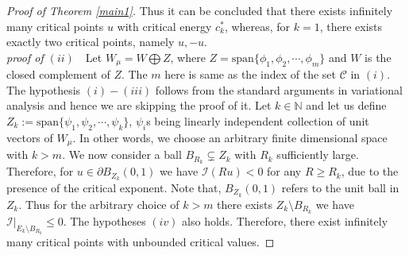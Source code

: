 \documentclass[12pt]{extarticle}
\theoremstyle{definition}
\theoremstyle{remark}
\theoremstyle{definition}
\numberwithin{equation}{section}
\numberwithin{equation}{section}
\begin{document}
\begin{proof}[Proof of Theorem \ref{main1}]
Thus it can be concluded that there exists infinitely many critical points $u$ with critical energy $c_k^*$, whereas, for $k=1$, there exists exactly two critical points, namely $u,-u$.\\
{\it proof of $(ii)$}~~Let $W_{\mu}=W\bigoplus Z$, where $Z=\text{span}\{\phi_1,\phi_2,\cdots,\phi_m\}$ and $W$ is the closed complement of $Z$. The $m$ here is same as the index of the set $\mathcal{C}$ in $(i)$. The hypothesis $(i)-(iii)$ follows from the standard arguments in variational analysis and hence we are skipping the proof of it. Let $k\in\mathbb{N}$ and let us define $Z_k:=\text{span}\{\psi_1,\psi_2,\cdots,\psi_k\}$, $\psi_i$s being linearly independent collection of unit vectors of $W_{\mu}$. In other words, we choose an arbitrary finite dimensional space with $k>m$. We now consider a ball $B_{R_k}\subsetneq Z_k$ with $R_k$ sufficiently large. Therefore, for $u\in \partial B_{Z_k}(0,1)$ we have $\mathcal{I}(R u)<0$ for any $R\geq R_k$, due to the presence of the critical exponent. Note that, $B_{Z_k}(0,1)$ refers to the unit ball in $Z_k$. Thus for the arbitrary choice of $k>m$ there exists $Z_k\setminus B_{R_k}$ we have $\mathcal{I}|_{E_k\setminus B_{R_k}}\leq 0$. The hypotheses $(iv)$ also holds. Therefore, there exist infinitely many critical points with unbounded critical values.
\end{proof}
\end{document}
